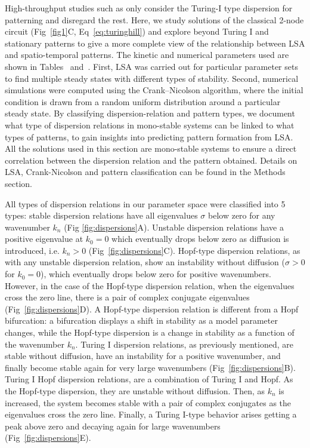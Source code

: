 \documentclass[10pt,letterpaper]{article}
\begin{document}
High-throughput studies such as \cite{Scholes2019, Zheng2016, Marcon} only consider the Turing-I type dispersion for patterning and disregard the rest.
Here, we study solutions of the classical 2-node circuit (Fig~\ref{fig1}C, Eq~\ref{eq:turinghill}) and explore beyond Turing I and stationary patterns to give a more complete view of the relationship between LSA and spatio-temporal patterns. 
The kinetic and numerical parameters used are shown in Tables~ and~.
First, LSA was carried out for particular parameter sets to find multiple steady states with different types of stability.
Second, numerical simulations were computed using the Crank–Nicolson algorithm, where the initial condition is drawn from a random uniform distribution around a particular steady state. By classifying dispersion-relation and pattern types, we document what type of dispersion relations in mono-stable systems can be linked to what types of patterns, to gain insights into predicting pattern formation from LSA. All the solutions used in this section are mono-stable systems to ensure a direct correlation between the dispersion relation and the pattern obtained. Details on LSA, Crank-Nicolson and pattern classification can be found in the Methods section.

All types of dispersion relations in our parameter space were classified into 5 types: stable dispersion relations have all eigenvalues $\sigma$ below zero for any wavenumber $k_{n}$ (Fig \ref{fig:dispersions}A). Unstable dispersion relations have a positive eigenvalue at $k_{0}=0$ which eventually drops below zero as diffusion is introduced, i.e. $k_{n}>0$ (Fig~\ref{fig:dispersions}C). Hopf-type dispersion relations, as with any unstable dispersion relation, show an instability without diffusion ($\sigma>0$ for $k_{0}=0$), which eventually drops below zero for positive wavenumbers. However, in the case of the Hopf-type dispersion relation, when the eigenvalues cross the zero line, there is a pair of complex conjugate eigenvalues (Fig~\ref{fig:dispersions}D).
A Hopf-type dispersion relation is different from a Hopf bifurcation: a bifurcation displays a shift in stability as a model parameter changes, while the Hopf-type dispersion is a change in stability as a function of the wavenumber $k_{n}$.
Turing I dispersion relations, as previously mentioned, are stable without diffusion, have an instability for a positive wavenumber, and finally become stable again for very large wavenumbers (Fig~\ref{fig:dispersions}B).
Turing I Hopf dispersion relations, are a combination of Turing I and Hopf. As the Hopf-type dispersion, they are unstable without diffusion. Then, as $k_{n}$ is increased, the system becomes stable with a pair of complex conjugates as the eigenvalues cross the zero line.
Finally, a Turing I-type behavior arises getting a peak above zero and decaying again for large wavenumbers (Fig~\ref{fig:dispersions}E).
\end{document}
